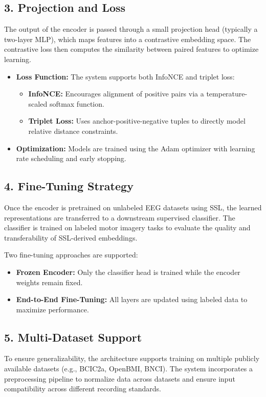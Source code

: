 \subsection*{3. Projection and Loss}

The output of the encoder is passed through a small projection head (typically a two-layer MLP), which maps features into a contrastive embedding space. The contrastive loss then computes the similarity between paired features to optimize learning.

\begin{itemize}
    \item \textbf{Loss Function:} The system supports both InfoNCE and triplet loss:
    \begin{itemize}
        \item \textbf{InfoNCE:} Encourages alignment of positive pairs via a temperature-scaled softmax function.
        \item \textbf{Triplet Loss:} Uses anchor-positive-negative tuples to directly model relative distance constraints.
    \end{itemize}
    \item \textbf{Optimization:} Models are trained using the Adam optimizer with learning rate scheduling and early stopping.
\end{itemize}

\subsection*{4. Fine-Tuning Strategy}

Once the encoder is pretrained on unlabeled EEG datasets using SSL, the learned representations are transferred to a downstream supervised classifier. The classifier is trained on labeled motor imagery tasks to evaluate the quality and transferability of SSL-derived embeddings.

Two fine-tuning approaches are supported:
\begin{itemize}
    \item \textbf{Frozen Encoder:} Only the classifier head is trained while the encoder weights remain fixed.
    \item \textbf{End-to-End Fine-Tuning:} All layers are updated using labeled data to maximize performance.
\end{itemize}

\subsection*{5. Multi-Dataset Support}

To ensure generalizability, the architecture supports training on multiple publicly available datasets (e.g., BCIC2a, OpenBMI, BNCI). The system incorporates a preprocessing pipeline to normalize data across datasets and ensure input compatibility across different recording standards.